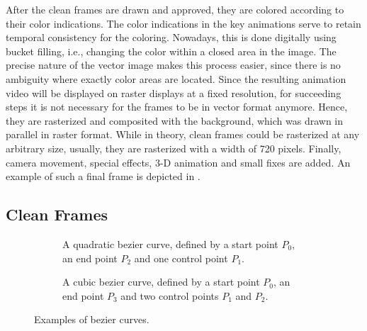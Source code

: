 After the clean frames are drawn and approved, they are colored according to their color indications. The color indications in the key animations serve to retain temporal consistency for the coloring. Nowadays, this is done digitally using bucket filling, i.e., changing the color within a closed area in the image. The precise nature of the vector image makes this process easier, since there is no ambiguity where exactly color areas are located. Since the resulting animation video will be displayed on raster displays at a fixed resolution, for succeeding steps it is not necessary for the frames to be in vector format anymore. Hence, they are rasterized and composited with the background, which was drawn in parallel in raster format. While in theory, clean frames could be rasterized at any arbitrary size, usually, they are rasterized with a width of 720 pixels. Finally, camera movement, special effects, 3-D animation and small fixes are added. An example of such a final frame is depicted in . 


\subsection{Clean Frames}
\label{subsec:cleanframes}

\begin{figure}
        \begin{subfigure}[b]{0.4\textwidth}
    \caption{A quadratic bezier curve, defined by a start point $P_0$, an end point $P_2$ and one control point $P_1$.}
    \end{subfigure}
    \hfill
    \begin{subfigure}[b]{0.4\textwidth}
    \caption{A cubic bezier curve, defined by a start point $P_0$, an end point $P_3$ and two control points $P_1$ and $P_2$.}
    \end{subfigure}
    \caption{Examples of bezier curves.}
    \label{fig:bezier-example}
\end{figure}


